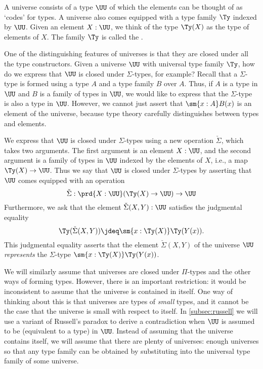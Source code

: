 A universe consists of a type $\UU$ of which the elements can be thought of as `codes' for types. A universe also comes equipped with a type family $\Ty$ indexed by $\UU$. Given an element $X:\UU$, we think of the type $\Ty(X)$ as the type of elements of $X$. The family $\Ty$ is called the .

One of the distinguishing features of universes is that they are closed under all the type constructors. Given a universe $\UU$ with universal type family $\Ty$, how do we express that $\UU$ is closed under $\Sigma$-types, for example? Recall that a $\Sigma$-type is formed using a type $A$ and a type family $B$ over $A$. Thus, if $A$ is a type in $\UU$ and $B$ is a family of types in $\UU$, we would like to express that the $\Sigma$-type is also a type in $\UU$. However, we cannot just assert that $\sm{x:A}B(x)$ is an element of the universe, because type theory carefully distinguishes between types and elements.

We express that $\UU$ is closed under $\Sigma$-types using a new operation $\check{\Sigma}$, which takes two arguments. The first argument is an element $X:\UU$, and the second argument is a family of types in $\UU$ indexed by the elements of $X$, i.e., a map $\Ty(X)\to\UU$. Thus we say that $\UU$ is closed under $\Sigma$-types by asserting that $\UU$ comes equipped with an operation
\begin{equation*}
  \check{\Sigma} : \prd{X:\UU} (\Ty(X)\to\UU)\to\UU
\end{equation*}
Furthermore, we ask that the element $\check{\Sigma}(X,Y):\UU$ satisfies the judgmental equality
\begin{equation*}
  \Ty(\check{\Sigma}(X,Y))\jdeq\sm{x:\Ty(X)}\Ty(Y(x)).
\end{equation*}
This judgmental equality asserts that the element $\check{\Sigma}(X,Y)$ of the universe $\UU$ \emph{represents} the $\Sigma$-type $\sm{x:\Ty(X)}\Ty(Y(x))$.

We will similarly assume that universes are closed under $\Pi$-types and the other ways of forming types. However, there is an important restriction: it would be inconsistent to assume that the universe is contained in itself. One way of thinking about this is that universes are types of \emph{small} types, and it cannot be the case that the universe is small with respect to itself. In \cref{subsec:russell} we will use a variant of Russell's paradox to derive a contradiction when $\UU$ is assumed to be (equivalent to a type) in $\UU$. Instead of assuming that the universe contains itself, we will assume that there are plenty of universes: enough universes so that any type family can be obtained by substituting into the universal type family of some universe.

